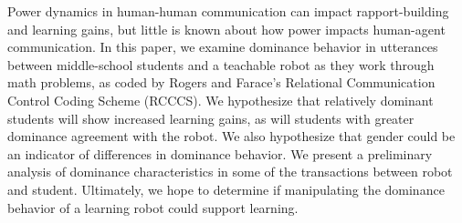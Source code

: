 Power dynamics in human-human communication can impact rapport-building and learning gains, but little is known about how power impacts human-agent communication.  In this paper, we examine dominance behavior in utterances between middle-school students and a teachable robot as they work through math problems, as coded by Rogers and Farace's Relational Communication Control Coding Scheme (RCCCS).  We hypothesize that relatively dominant students will show increased learning gains, as will students with greater dominance agreement with the robot.  We also hypothesize that gender could be an indicator of differences in dominance behavior.  We present a preliminary analysis of dominance characteristics in some of the transactions between robot and student.  Ultimately, we hope to determine if manipulating the dominance behavior of a learning robot could support learning.
